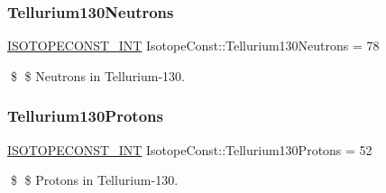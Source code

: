 \subsubsection{\texorpdfstring{Tellurium130\+Neutrons}{Tellurium130Neutrons}}
{\footnotesize\ttfamily \mbox{\hyperlink{group___isotope_const-_macros_ga5f18360b3e99483a35c32d789e62621c}{I\+S\+O\+T\+O\+P\+E\+C\+O\+N\+S\+T\+\_\+\+I\+NT}} Isotope\+Const\+::\+Tellurium130\+Neutrons = 78}

\$ \$ Neutrons in Tellurium-\/130. \mbox{\label{group___isotope_const-_tellurium-_te130_gaa7b689f78bd6a660843f77e2f83fa515}} 
\subsubsection{\texorpdfstring{Tellurium130\+Protons}{Tellurium130Protons}}
{\footnotesize\ttfamily \mbox{\hyperlink{group___isotope_const-_macros_ga5f18360b3e99483a35c32d789e62621c}{I\+S\+O\+T\+O\+P\+E\+C\+O\+N\+S\+T\+\_\+\+I\+NT}} Isotope\+Const\+::\+Tellurium130\+Protons = 52}

\$ \$ Protons in Tellurium-\/130. 